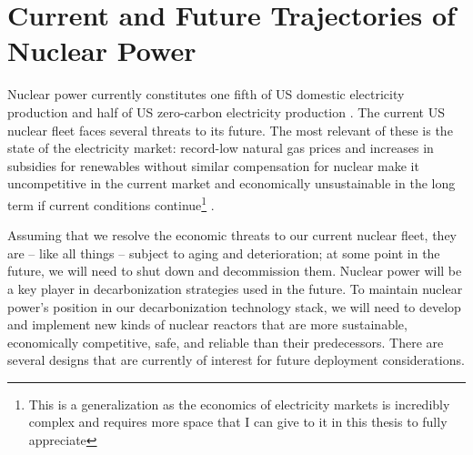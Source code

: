 %
\section{Current and Future Trajectories of Nuclear Power}%
\label{sec:current_and_future_trajectories_of_nuclear_power}
Nuclear power currently constitutes one fifth of US domestic electricity
production and half of US zero-carbon electricity production
\cite{eia_faq_2021} \cite{doene_facts_2021}. The current US nuclear
fleet faces several threats to its future. The most relevant of
these is the state of the electricity market: record-low natural gas prices and
increases in subsidies for renewables without similar compensation for
nuclear make it uncompetitive in the current market and economically unsustainable in the
long term if current conditions continue\footnote{This is a generalization as
the economics of electricity markets is incredibly complex and requires more space that I can give to it
in this thesis to fully appreciate} \cite{szilard_economic_2016}.

Assuming that we resolve the economic threats to our current nuclear fleet, they
are -- like all things -- subject to aging and deterioration; at some point in
the future, we will need to shut down and decommission them. 
Nuclear power will be a key player in decarbonization
strategies used in the future. To maintain nuclear power's position in our decarbonization technology
stack, we will need to develop and implement new kinds of nuclear reactors that
are more sustainable, economically competitive, safe, and reliable than their
predecessors. There are several designs that are currently of interest for future
deployment considerations.
 
